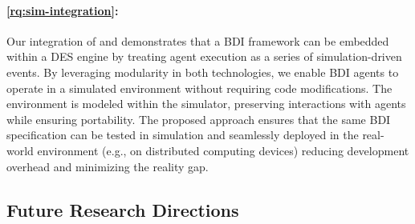 \paragraph{
    \ref{rq:sim-integration}:
}


Our integration of \jakta{} and \alchemist{} demonstrates that a \ac{BDI} framework can be embedded
within a \ac{DES} engine by treating agent execution as a series of simulation-driven events.
%
By leveraging modularity in both technologies, we enable \ac{BDI} agents to operate in a simulated
environment without requiring code modifications.
%
The environment is modeled within the simulator, preserving interactions with agents while ensuring portability.
%
The proposed approach ensures that the same \ac{BDI} specification can be tested in simulation
and seamlessly deployed in the real-world environment
(e.g., on distributed computing devices)
reducing development overhead and minimizing the reality gap.

%


\subsection{Future Research Directions}\label{subsec:future-research-directions}

